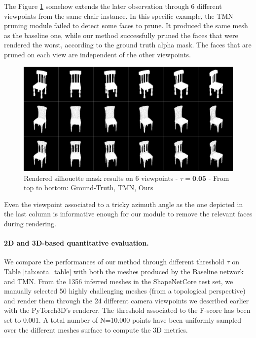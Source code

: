 The Figure \ref{fig:pruning_multi_view} somehow extends the later observation through 6 different viewpoints from the same chair instance. In this specific example, the TMN pruning module failed to detect some faces to prune. It produced the same mesh as the baseline one, while our method successfully pruned the faces that were rendered the worst, according to the ground truth alpha mask. The faces that are pruned on each view are independent of the other viewpoints. 

\begin{figure}[htp!]%
\begin{center}
\includegraphics[width=\linewidth]{images/adaptativesr/severalview2D.png}
\end{center}
    \caption{Rendered silhouette mask results on 6 viewpoints - $\tau =\textbf{0.05}$ - From top to bottom: Ground-Truth, TMN\citep{pan2019deep},  Ours}
\label{fig:pruning_multi_view}
\end{figure}

Even the viewpoint associated to a tricky azimuth angle as the one depicted in the last column is informative enough for our module to remove the relevant faces during rendering.

\paragraph{2D and 3D-based quantitative evaluation.} We compare the performances of our method through different threshold $\tau$ on Table \ref{tab:sota_table} with both the meshes produced by the Baseline network and TMN\citep{pan2019deep}. From the 1356 inferred meshes in the ShapeNetCore\citep{chang2015shapenet} test set, we manually selected 50 highly challenging meshes (from a topological perspective) and render them through the 24 different camera viewpoints we described earlier with the PyTorch3D's renderer. The threshold associated to the F-score has been set to 0.001. A total number of N=10.000 points have been uniformly sampled over the different meshes surface to compute the 3D metrics. 

